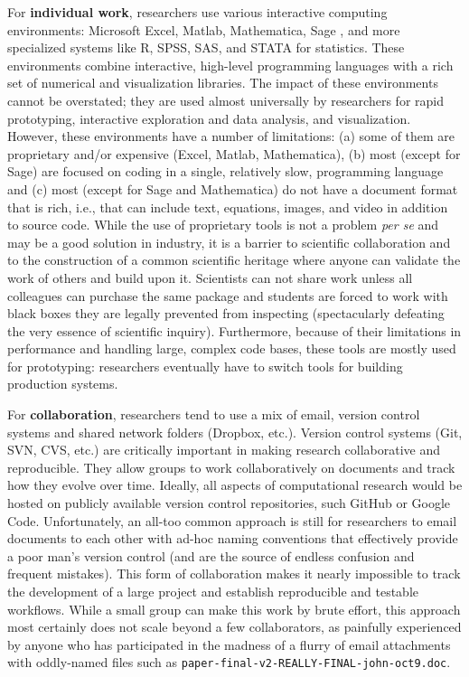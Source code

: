 \documentclass[ChapterTOCs,krantz2]{krantz} %
\theoremstyle{definition}
\begin{document}
For \textbf{individual work}, researchers use various interactive
computing environments: Microsoft Excel, Matlab, Mathematica\textregistered,
Sage \cite{sage}, and more specialized systems like R, SPSS, SAS, and STATA for
statistics. These environments combine interactive, high-level programming
languages with a rich set of numerical and visualization libraries. The impact
of these environments cannot be overstated; they are used almost universally by
researchers for rapid prototyping, interactive exploration and data analysis,
and visualization. However, these environments have a number of limitations:
(a) some of them are proprietary and/or expensive (Excel, Matlab, Mathematica),
(b) most (except for Sage) are focused on coding in a single, relatively slow,
programming language and (c) most (except for Sage and Mathematica) do not have
a document format that is rich, i.e., that can include text, equations, images,
and video in addition to source code. While the use of proprietary tools is not
a problem \emph{per se} and may be a good solution in industry, it is a barrier
to scientific collaboration and to the construction of a common scientific
heritage where anyone can validate the work of others and build upon it.
Scientists can not share work unless all colleagues can purchase the same
package and students are forced to work with black boxes they are legally
prevented from inspecting (spectacularly defeating the very essence of
scientific inquiry). Furthermore, because of their limitations in performance
and handling large, complex code bases, these tools are mostly used for
prototyping: researchers eventually have to switch tools for building
production systems.

For \textbf{collaboration}, researchers tend to use a mix of email, version
control systems and shared network folders (Dropbox, etc.).  Version control
systems (Git, SVN, CVS, etc.) are critically important in making research
collaborative and reproducible. They allow groups to work collaboratively on
documents and track how they evolve over time. Ideally, all aspects of
computational research would be hosted on publicly available version control
repositories, such GitHub or Google Code. Unfortunately, an all-too common
approach is still for researchers to email documents to each other with ad-hoc
naming conventions that effectively provide a poor man's version control (and
are the source of endless confusion and frequent mistakes). This form of
collaboration makes it nearly impossible to track the development of a large
project and establish reproducible and testable workflows.  While a small group
can make this work by brute effort, this approach most certainly does not scale
beyond a few collaborators, as painfully experienced by anyone who has
participated in the madness of a flurry of email attachments with oddly-named
files such as {\tt paper-final-v2-REALLY-FINAL-john-oct9.doc}.
\end{document}

